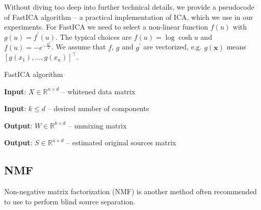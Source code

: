 \documentclass[../main.tex]{subfiles} %
\begin{document}
Without diving too deep into further technical details, we provide a pseudocode of FastICA algorithm \cite{ica,fastica} -- a practical implementation of ICA, which we use in our experiments. For FastICA we need to select a non-linear function $f(u)$ with $g(u) = f^\prime(u)$. The typical choices are $f(u) = \log\cosh u$ and $f(u) = - e^{-\frac{u^2}{2}}$. We assume that $f$, $g$ and $g^\prime$ are vectorized, e.g. $g(\mathbf{x})$ means $\left[ g(x_1), \ldots, g(x_n) \right]^\top$.

\begin{algorithm} 
	\begin{algorithmic}
		\caption{FastICA algorithm}\label{fastica}
		\item \textbf{Input}: $X \in \mathbb{R}^{n \times d}$ -- whitened data matrix
		\item \textbf{Input}: $k \le d$ -- desired number of components
		\item \textbf{Output}: $W \in \mathbb{R}^{k \times d}$ -- unmixing matrix
		\item \textbf{Output}: $S \in \mathbb{R}^{n \times d}$ -- estimated original sources matrix
		
		 
		 
		 
		\EndWhile
		\EndFor
		\EndFunction
	\end{algorithmic}
\end{algorithm}

\subsection{NMF}

Non-negative matrix factorization (NMF) \cite{nmf} is another method often recommended to use to perform blind source separation.
\end{document}
